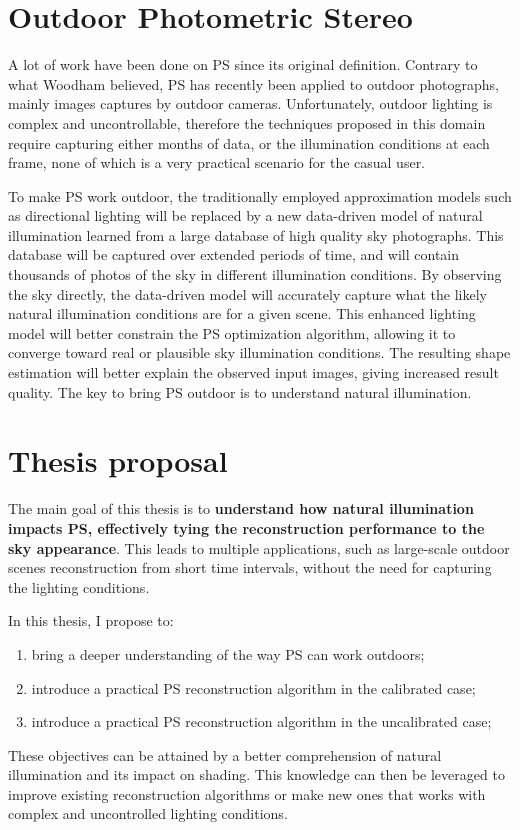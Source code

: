 \section{Outdoor Photometric Stereo}

A lot of work have been done on PS since its original definition. Contrary to what Woodham believed, PS has recently been applied to outdoor photographs, mainly images captures by outdoor cameras. Unfortunately, outdoor lighting is complex and uncontrollable, therefore the techniques proposed in this domain require capturing either months of data, or the illumination conditions at each frame, none of which is a very practical scenario for the casual user.

To make PS work outdoor, the traditionally employed approximation models such as directional lighting will be replaced by a new data-driven model of natural illumination learned from a large database of high quality sky photographs. This database will be captured over extended periods of time, and will contain thousands of photos of the sky in different illumination conditions. By observing the sky directly, the data-driven model will accurately capture what the likely natural illumination conditions are for a given scene. This enhanced lighting model will better constrain the PS optimization algorithm, allowing it to converge toward real or plausible sky illumination conditions. The resulting shape estimation will better explain the observed input images, giving increased result quality. The key to bring PS outdoor is to understand natural illumination.

\section{Thesis proposal}

The main goal of this thesis is to \textbf{understand how natural illumination impacts PS, effectively tying the reconstruction performance to the sky appearance}. This leads to multiple applications, such as large-scale outdoor scenes reconstruction from short time intervals, without the need for capturing the lighting conditions.

In this thesis, I propose to:
\begin{enumerate}
  \item bring a deeper understanding of the way PS can work outdoors;
  \item introduce a practical PS reconstruction algorithm in the calibrated case;
  \item introduce a practical PS reconstruction algorithm in the uncalibrated case;
\end{enumerate}
These objectives can be attained by a better comprehension of natural illumination and its impact on shading. This knowledge can then be leveraged to improve existing reconstruction algorithms or make new ones that works with complex and uncontrolled lighting conditions.

